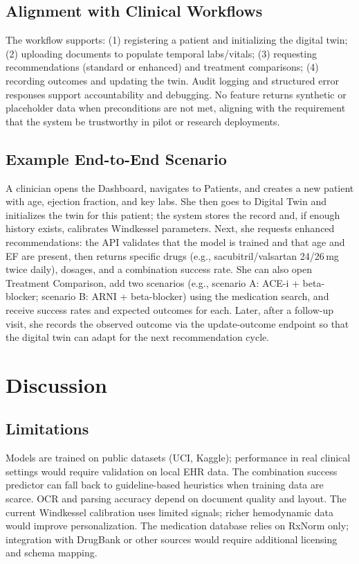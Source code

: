 \documentclass[conference]{IEEEtran}
\begin{document}
\subsection{Alignment with Clinical Workflows}
The workflow supports: (1) registering a patient and initializing the digital twin; (2) uploading documents to populate temporal labs/vitals; (3) requesting recommendations (standard or enhanced) and treatment comparisons; (4) recording outcomes and updating the twin. Audit logging and structured error responses support accountability and debugging. No feature returns synthetic or placeholder data when preconditions are not met, aligning with the requirement that the system be trustworthy in pilot or research deployments.

\subsection{Example End-to-End Scenario}
A clinician opens the Dashboard, navigates to Patients, and creates a new patient with age, ejection fraction, and key labs. She then goes to Digital Twin and initializes the twin for this patient; the system stores the record and, if enough history exists, calibrates Windkessel parameters. Next, she requests enhanced recommendations: the API validates that the model is trained and that age and EF are present, then returns specific drugs (e.g., sacubitril/valsartan 24/26\,mg twice daily), dosages, and a combination success rate. She can also open Treatment Comparison, add two scenarios (e.g., scenario A: ACE-i + beta-blocker; scenario B: ARNI + beta-blocker) using the medication search, and receive success rates and expected outcomes for each. Later, after a follow-up visit, she records the observed outcome via the update-outcome endpoint so that the digital twin can adapt for the next recommendation cycle.

\section{Discussion}

\subsection{Limitations}
Models are trained on public datasets (UCI, Kaggle); performance in real clinical settings would require validation on local EHR data. The combination success predictor can fall back to guideline-based heuristics when training data are scarce. OCR and parsing accuracy depend on document quality and layout. The current Windkessel calibration uses limited signals; richer hemodynamic data would improve personalization. The medication database relies on RxNorm only; integration with DrugBank or other sources would require additional licensing and schema mapping.
\end{document}

